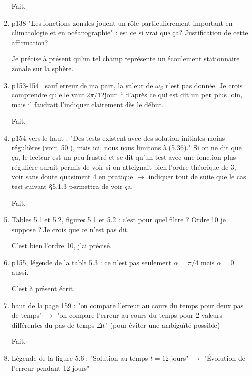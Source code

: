 \documentclass[10pt,a4paper]{article}
\begin{document}
\begin{enumerate}
{\color{blue} Fait.} 


\item p138 "Les fonctions zonales jouent un rôle particulièrement important en climatologie et en océanographie" : est ce si vrai que ça? Justification de cette affirmation?

{\color{blue} Je précise à présent qu'un tel champ représente un écoulement stationnaire zonale sur la sphère.} 


\item p153-154 : sauf erreur de ma part, la valeur de $\omega_S$ n'est pas donnée. Je crois comprendre qu'elle vaut $2\pi/12 \text{jour}^{-1}$ d'après ce qui est dit un peu plus loin, mais il faudrait l'indiquer clairement dès le début.

{\color{blue} Fait.} 


\item p154 vers le haut : "Des tests existent avec des solution initiales moins régulières (voir [50]), mais ici, nous nous limitons à (5.36)." Si on ne dit que ça, le lecteur est un peu frustré et se dit qu'un test avec une fonction plus régulière aurait permis de voir si on atteignait bien l'ordre théorique de 3, voir sans doute quasiment 4 en pratique $\rightarrow$ indiquer tout de suite que le cas test suivant §5.1.3 permettra de voir ça.

{\color{blue} Fait.} 


\item Tables 5.1 et 5.2, figures 5.1 et 5.2 : c’est pour quel filtre ? Ordre 10 je suppose ? Je
crois que ce n’est pas dit.

{\color{blue} C'est bien l'ordre 10, j'ai précisé.} 


\item p155, légende de la table 5.3 : ce n'est pas seulement $\alpha = \pi/4$ mais $\alpha=0$ aussi. 

{\color{blue} C'est à présent écrit.} 


\item haut de la page 159 :  "on compare l'erreur au cours du temps pour deux pas de temps" $\rightarrow$ "on compare l'erreur au cours du temps pour 2 valeurs différentes du pas de temps $\Delta t$" (pour éviter une ambiguïté possible) 

{\color{blue} Fait.} 



\item Légende de la figure 5.6 : "Solution au temps $t=12$ jours" $\rightarrow$ "Évolution de l'erreur pendant 12 jours"


\end{enumerate}
\end{document}
